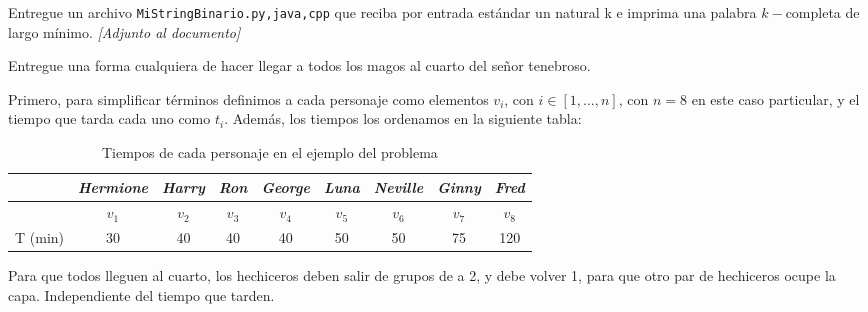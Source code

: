 \documentclass[letterpaper,10pt,table, dvipsnames]{article}
\begin{document}
\begin{tcolorbox}
 Entregue un archivo \texttt{MiStringBinario.{py,java,cpp}} que reciba por entrada estándar un natural k e imprima una palabra $k-$completa de largo mínimo. \textit{[Adjunto al documento]}
\end{tcolorbox}



\newpage

\begin{tcolorbox}
 Entregue una forma cualquiera de hacer llegar a todos los magos al cuarto del señor tenebroso.
\end{tcolorbox}

Primero, para simplificar términos definimos a cada personaje como elementos $v_{i}$, con $i\in[1,\ldots,n]$, con $n=8$ en este caso particular, y el tiempo que tarda cada uno como $t_i$. Además, los tiempos los ordenamos en la siguiente tabla:

\begin{table}[htbp]
  \centering
  \caption{Tiempos de cada personaje en el ejemplo del problema}
    \begin{tabular}{|c|c|c|c|c|c|c|c|c|}
    \hline
          & \textit{Hermione}& \textit{Harry} & \textit{Ron} & \textit{George} & \textit{Luna} & \textit{Neville} & \textit{Ginny} & \textit{Fred} \bigstrut\\
    \hline
          & $v_1 $ & $v_2 $ & $v_3 $ & $v_4 $  & $v_5 $ & $v_6 $ & $v_7 $ & $v_8 $ \bigstrut\\
    \hline
    T (min) & 30    & 40    & 40    & 40    & 50    & 50    & 75    & 120 \bigstrut\\
    \hline
    \end{tabular}%
  \label{tab:tiempos}%
\end{table}%

Para que todos lleguen al cuarto, los hechiceros deben salir de grupos de a 2, y debe volver 1, para que otro par de hechiceros ocupe la capa. Independiente del tiempo que tarden.\\
\end{document}
